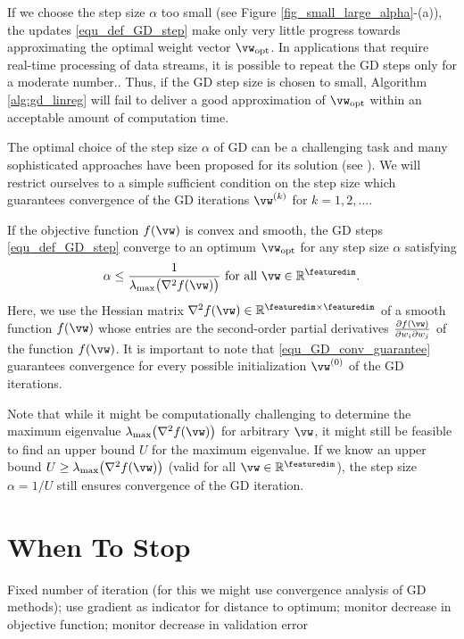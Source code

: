 \documentclass[12pt]{report}
\begin{document}
If we choose the step size $\alpha$ too small (see Figure \ref{fig_small_large_alpha}-(a)), 
the updates \eqref{equ_def_GD_step} make only very little progress towards 
approximating the optimal weight vector $\vw_{\rm opt}$. In applications that
require real-time processing of data streams, it is possible to repeat the GD 
steps only for a moderate number.. Thus, if the GD step size is chosen to 
small, Algorithm \ref{alg:gd_linreg} will fail to deliver a good approximation 
of $\vw_{\rm opt}$ within an acceptable amount of computation time. 

The optimal choice of the step size $\alpha$ of GD can be a challenging 
task and many sophisticated approaches have been proposed for its 
solution (see \cite[Chapter 8]{Goodfellow-et-al-2016}). We will restrict 
ourselves to a simple sufficient condition on the step size which guarantees 
convergence of the GD iterations $\vw^{(k)}$ for $k=1,2,\ldots$. 

If the objective function $f(\vw)$ is convex and smooth, the 
GD steps \eqref{equ_def_GD_step} converge to an optimum 
$\vw_{\rm opt}$ for any step size $\alpha$ satisfying \cite{nestrov04}
\begin{equation} 
\label{equ_GD_conv_guarantee}
\alpha \leq \frac{1}{\lambda_{\rm max} \big( \nabla^{2} f(\vw) \big) }\mbox{ for all } \vw \in \mathbb{R}^{\featuredim}. 
\end{equation} 
Here, we use the Hessian matrix $ \nabla^{2} f(\vw) \in \mathbb{R}^{\featuredim \times \featuredim}$ 
of a smooth function $f(\vw)$ whose entries are the second-order 
partial derivatives $\frac{\partial f(\vw)}{\partial w_{i} \partial w_{j}}$ 
of the function $f(\vw)$. It is important to note that \eqref{equ_GD_conv_guarantee} 
guarantees convergence for every possible initialization $\vw^{(0)}$ 
of the GD iterations. 

Note that while it might be computationally challenging to determine the maximum eigenvalue 
$\lambda_{\rm max} \big( \nabla^{2} f(\vw) \big)$ for arbitrary $\vw$, it might still be feasible to find an 
upper bound $U$ for the maximum eigenvalue. If we know an upper bound $U \geq \lambda_{\rm max} \big( \nabla^{2} f(\vw) \big)$ (valid for all $\vw \in \mathbb{R}^{\featuredim}$), 
the step size $\alpha =1/U$ still ensures convergence of the GD iteration.

\section{When To Stop} 
Fixed number of iteration (for this we might use convergence analysis of GD methods); 
use gradient as indicator for distance to optimum; monitor decrease in objective function; 
monitor decrease in validation error
\end{document}
